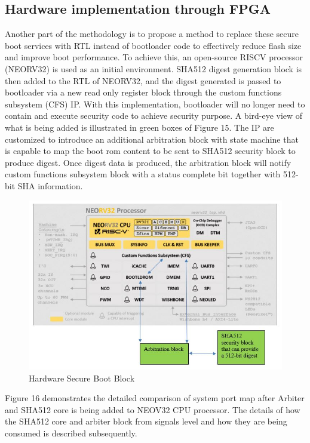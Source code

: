 \documentclass[]{rsos}%
\begin{document}
\subsection{ Hardware implementation through FPGA}
Another part of the methodology is to propose a method to replace these secure boot services with RTL instead of bootloader code to effectively reduce flash size and improve boot performance. To achieve this, an open-source RISCV processor (NEORV32) is used as an initial environment. SHA512 digest generation block is then added to the RTL of NEORV32, and the digest generated is passed to bootloader via a new read only register block through the custom functions subsystem (CFS) IP. With this implementation, bootloader will no longer need to contain and execute security code to achieve security purpose. A bird-eye view of what is being added is illustrated in green boxes of Figure 15. The IP are customized to introduce an additional arbitration block with state machine that is capable to map the boot rom content to be sent to SHA512 security block to produce digest. Once digest data is produced, the arbitration block will notify custom functions subsystem block with a status complete bit together with 512-bit SHA information. 

\begin{figure}[hbt!]
	\centering
	\includegraphics[width=1\textwidth]{figs/HardwareSecureBootBlock.JPG}
	\caption{Hardware Secure Boot Block}
\end{figure}


Figure 16 demonstrates the detailed comparison of system port map after Arbiter and SHA512 core is being added to NEOV32 CPU processor. The details of how the SHA512 core and arbiter block from signals level and how they are being consumed is described subsequently.
\end{document}
